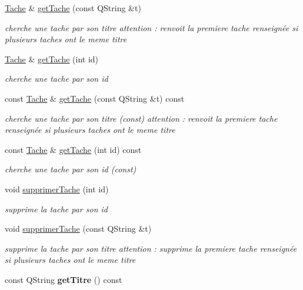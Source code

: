 \begin{DoxyCompactItemize}
\item 
\hyperlink{class_tache}{Tache} \& \hyperlink{class_projet_a4946787213f47a2f98eb4d720b290fdc}{get\+Tache} (const Q\+String \&t)
\begin{DoxyCompactList}\small\item\em cherche une tache par son titre attention \+: renvoit la premiere tache renseignée si plusieurs taches ont le meme titre \end{DoxyCompactList}\item 
\hyperlink{class_tache}{Tache} \& \hyperlink{class_projet_ad01ec8299256dc528c872580b2946bb9}{get\+Tache} (int id)
\begin{DoxyCompactList}\small\item\em cherche une tache par son id \end{DoxyCompactList}\item 
const \hyperlink{class_tache}{Tache} \& \hyperlink{class_projet_a1d7e504c6739311a8b189c9d0b17c0ff}{get\+Tache} (const Q\+String \&t) const 
\begin{DoxyCompactList}\small\item\em cherche une tache par son titre (const) attention \+: renvoit la premiere tache renseignée si plusieurs taches ont le meme titre \end{DoxyCompactList}\item 
const \hyperlink{class_tache}{Tache} \& \hyperlink{class_projet_aa7ea7238294ad04594a868d887c4f327}{get\+Tache} (int id) const 
\begin{DoxyCompactList}\small\item\em cherche une tache par son id (const) \end{DoxyCompactList}\item 
void \hyperlink{class_projet_a6a6be3877830082584754872ca58ea3c}{supprimer\+Tache} (int id)
\begin{DoxyCompactList}\small\item\em supprime la tache par son id \end{DoxyCompactList}\item 
void \hyperlink{class_projet_ac806eff7ed511d375d34860ea682e465}{supprimer\+Tache} (const Q\+String \&t)
\begin{DoxyCompactList}\small\item\em supprime la tache par son titre attention \+: supprime la premiere tache renseignée si plusieurs taches ont le meme titre \end{DoxyCompactList}\item 
\hypertarget{class_projet_a531e453dd67e8192bdd6be5148aac82c}{}const Q\+String {\bfseries get\+Titre} () const \label{class_projet_a531e453dd67e8192bdd6be5148aac82c}


\end{DoxyCompactItemize}
